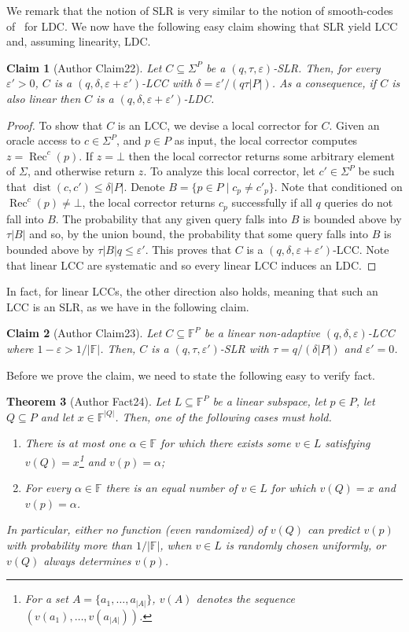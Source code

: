 \documentclass[10pt,a4paper]{article}
\newtheorem{nttheorem}{Theorem}
\newtheorem{ntclaim}[nttheorem]{Claim}
\begin{document}
We remark that the notion of SLR is very similar to the notion of smooth-codes of~\cite{ref23} for LDC. We now have the following easy claim showing that SLR yield LCC and, assuming linearity, LDC.
\begin{ntclaim}[Author Claim22]
Let $C\subseteq\Sigma^P$ be a $(q,\tau,\varepsilon)$-SLR. Then, for every $\varepsilon'>0$, $C$ is a $(q,\delta,\varepsilon+\varepsilon')$-LCC with $\delta=\varepsilon'/(q\tau|P|)$. As a consequence, if $C$ is also linear then $C$ is a $(q,\delta,\varepsilon+\varepsilon')$-LDC.
\end{ntclaim}
\begin{proof}
To show that $C$ is an LCC, we devise a local corrector for $C$. Given an oracle access to $c\in\Sigma^P$, and $p\in P$ as input, the local corrector computes $z=\operatorname{Rec}^c(p)$. If $z=\bot$ then the local corrector returns some arbitrary element of $\Sigma$, and otherwise return $z$. To analyze this local corrector, let $c'\in\Sigma^P$ be such that $\operatorname{dist}(c,c')\leq\delta|P|$. Denote $B=\{p\in P\mid c_p\ne c'_p\}$. Note that conditioned on $\operatorname{Rec}^c(p)\ne\bot$, the local corrector returns $c_p$ successfully if all $q$ queries do not fall into $B$. The probability that any given query falls into $B$ is bounded above by $\tau|B|$ and so, by the union bound, the probability that some query falls into $B$ is bounded above by $\tau|B|q\leq\varepsilon'$. This proves that $C$ is a $(q,\delta,\varepsilon+\varepsilon')$-LCC. Note that linear LCC are systematic and so every linear LCC induces an LDC.
\end{proof}
In fact, for linear LCCs, the other direction also holds, meaning that such an LCC is an SLR, as we have in the following claim.
\begin{ntclaim}[Author Claim23]
Let $C\subseteq\mathbb F^P$ be a linear non-adaptive $(q,\delta,\varepsilon)$-LCC where $1-\varepsilon>1/|\mathbb F|$. Then, $C$ is a $(q,\tau,\varepsilon')$-SLR with $\tau=q/(\delta|P|)$ and $\varepsilon'=0$.
\end{ntclaim}
Before we prove the claim, we need to state the following easy to verify fact.
\begin{nttheorem}[Author Fact24]
Let $L\subseteq\mathbb F^P$ be a linear subspace, let $p\in P$, let $Q\subseteq P$ and let $x\in\mathbb F^{|Q|}$. Then, one of the following cases must hold.
\begin{enumerate}
\item There is at most one $\alpha\in\mathbb F$ for which there exists some $v\in L$ satisfying $v(Q)=x$\footnote{For a set $A=\{a_1,\ldots,a_{|A|}\}$, $v(A)$ denotes the sequence $(v(a_1),\ldots,v(a_{|A|}))$.} and $v(p)=\alpha$;
\item For every $\alpha\in\mathbb F$ there is an equal number of $v\in L$ for which $v(Q)=x$ and $v(p)=\alpha$.
\end{enumerate}
In particular, either no function (even randomized) of $v(Q)$ can predict $v(p)$ with probability more than $1/|\mathbb F|$, when $v\in L$ is randomly chosen uniformly, or $v(Q)$ always determines $v(p)$.
\end{nttheorem}
\end{document}

